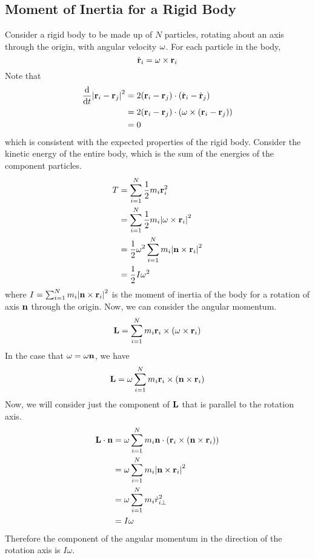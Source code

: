 \subsection{Moment of Inertia for a Rigid Body}
Consider a rigid body to be made up of \(N\) particles, rotating about an axis through the origin, with angular velocity \(\vb \omega\).
For each particle in the body,
\[
	\dot{\vb{r}}_i = \vb \omega \times \vb r_i
\]
Note that
\begin{align*}
	\dv{t} \abs{\vb r_i - \vb r_j}^2 & = 2(\vb r_i - \vb r_j) \cdot (\dot{\vb{r}}_i - \dot{\vb{r}}_j)                 \\
	                                 & = 2(\vb r_i - \vb r_j) \cdot (\omega \times (\vb r_i - \vb r_j)) \\
	                                 & = 0
\end{align*}
which is consistent with the expected properties of the rigid body.
Consider the kinetic energy of the entire body, which is the sum of the energies of the component particles.
\begin{align*}
	T & = \sum_{i=1}^N \frac{1}{2}m_i \vb r_i^2                              \\
	  & = \sum_{i=1}^N \frac{1}{2}m_i \abs{\vb\omega \times \vb r_i}^2       \\
	  & = \frac{1}{2} \omega^2 \sum_{i=1}^N m_i \abs{\vb n \times \vb r_i}^2 \\
	  & = \frac{1}{2}I\omega^2
\end{align*}
where \(I = \sum_{i=1}^N m_i \abs{\vb n \times \vb r_i}^2\) is the moment of inertia of the body for a rotation of axis \(\vb n\) through the origin.
Now, we can consider the angular momentum.
\[
	\vb L = \sum_{i=1}^N m_i \vb r_i \times (\vb \omega \times \vb r_i)
\]
In the case that \(\vb\omega = \omega \vb n\), we have
\[
	\vb L = \omega \sum_{i=1}^N m_i \vb r_i \times (\vb n \times \vb r_i)
\]
Now, we will consider just the component of \(\vb L\) that is parallel to the rotation axis.
\begin{align*}
	\vb L \cdot \vb n & = \omega \sum_{i=1}^N m_i \vb n \cdot (\vb r_i \times (\vb n \times \vb r_i)) \\
	                  & = \omega\sum_{i=1}^N m_i \abs{ \vb n \times \vb r_i }^2                       \\
	                  & = \omega\sum_{i=1}^N m_i {\dot r}_{i\perp}^2                                  \\
	                  & = I\omega
\end{align*}
Therefore the component of the angular momentum in the direction of the rotation axis is \(I\omega\).

